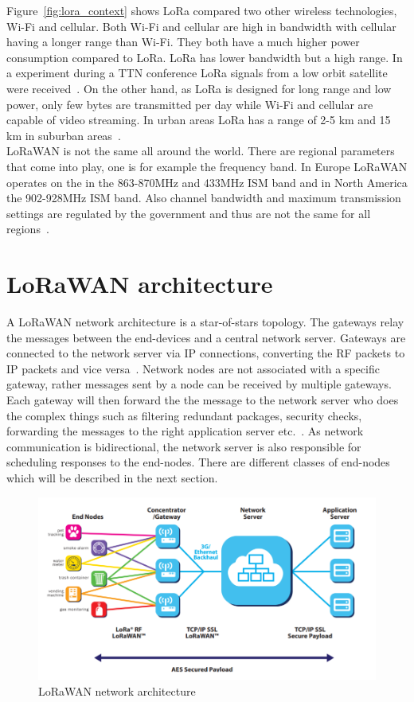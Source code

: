 Figure~\ref{fig:lora_context} shows LoRa compared two other wireless technologies, Wi-Fi and cellular. Both Wi-Fi and cellular
are high in bandwidth with cellular having a longer range than Wi-Fi. They both have a much higher power consumption compared to LoRa.
LoRa has lower bandwidth but a high range. In a experiment during a TTN conference LoRa signals from a low orbit satellite were received~\cite{loa_satellite}.
On the other hand, as LoRa is designed for long range and low power, only few bytes are transmitted per day while Wi-Fi and cellular are capable of video streaming.
In urban areas LoRa has a range of 2-5 km and 15 km in suburban areas~\cite{limits_lora}.\\
LoRaWAN is not the same all around the world. There are regional parameters that come into play, one is for example the frequency band.
In Europe LoRaWAN operates on the in the 863-870MHz and 433MHz ISM band and in North America the 902-928MHz ISM band. Also channel bandwidth and maximum transmission 
settings are regulated by the government and thus are not the same for all regions~\cite{lora_wan_regional}.

\section{LoRaWAN architecture}
A LoRaWAN network architecture is a star-of-stars topology. The gateways relay the messages between the end-devices and a central network server.
Gateways are connected to the network server via IP connections, converting the RF packets to IP packets and vice versa~\cite{about_lora_wan}.
Network nodes are not associated with a specific gateway, rather messages sent by a node can be received by multiple gateways. Each gateway will then 
forward the the message to the network server who does the complex things such as filtering redundant packages, security checks, forwarding the messages
to the right application server etc.~\cite{what_is_lora_wan}.
As network communication is bidirectional, the network server is also responsible for scheduling responses to the end-nodes. There are different classes of 
end-nodes which will be described in the next section.

\begin{figure}[h]
    \centering
    \includegraphics[width=1\textwidth]{figures/lorawan_network.png}
    \caption{LoRaWAN network architecture~\cite{what_is_lora_wan}}
    \label{fig:lorawan_network}
\end{figure}

